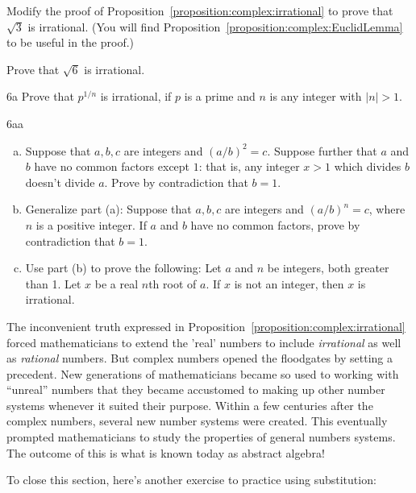 \begin{exercise}{4}
Modify the proof of Proposition~\ref{proposition:complex:irrational} to prove that $\sqrt{3}$ is irrational. (You will find Proposition~\ref{proposition:complex:EuclidLemma} to be useful in the proof.)
\end{exercise}

\begin{exercise}{5}
Prove that $\sqrt{6}$ is irrational.
\end{exercise}

\begin{exercise}{6a}
Prove that $p^{1/n}$ is irrational, if $p$ is a prime and $n$ is any integer with $|n|>1$.
\end{exercise}

\begin{exercise}{6aa}
\begin{enumerate}[(a)]
\item
Suppose that $a,b,c$ are integers and  $(a/b)^2 = c$.  Suppose further that $a$ and $b$ have no common factors except $1$: that is, any integer $x > 1$ which divides $b$ doesn't divide $a$.  Prove by contradiction that $b=1$.
\item
Generalize part (a): Suppose that $a,b,c$ are integers and  $(a/b)^n = c$, where $n$ is a positive integer. If $a$ and $b$ have no common factors, prove by contradiction that $b=1$.
\item
Use part (b) to prove the following: Let $a$ and $n$ be integers, both greater than 1. Let $x$ be a real $n$th root of $a$.  If $x$ is not an integer, then $x$ is irrational.
\end{enumerate}
\end{exercise}


The inconvenient truth expressed in Proposition~\ref{proposition:complex:irrational} forced mathematicians to extend
the 'real' numbers to include \emph{irrational} as well as \emph{rational}
numbers. But complex numbers opened the floodgates by setting a precedent. New generations of mathematicians 
became so used to working with ``unreal'' numbers that they became accustomed to making up other number systems whenever it suited their purpose.
Within a few centuries after the complex numbers, several new
number systems were created. This eventually prompted  mathematicians to study the properties of general numbers
systems. The outcome of this is what is known today as  abstract
algebra!

To close this section, here's another exercise to practice using substitution:


